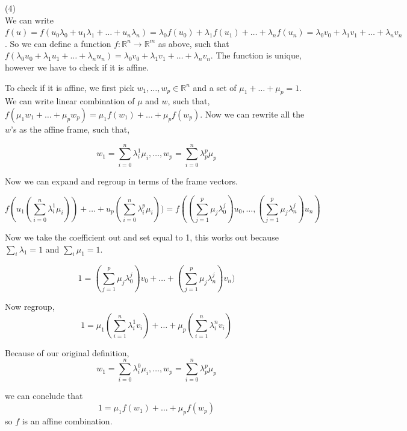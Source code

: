\documentclass[12pt]{article}
\begin{document}
\medskip
(4) \\
We can write $f(u) = f(u_0\lambda_0 + u_1\lambda_1 + \ldots + u_n\lambda_n) = \lambda_0f(u_0) + \lambda_1f(u_1) + \ldots + \lambda_nf(u_n) = \lambda_0v_0 + \lambda_1v_1 + \ldots + \lambda_nv_n$. So we can define a function $f: \mathbb{R} ^n \rightarrow \mathbb{R} ^m$ as above, such that $f(\lambda_0u_0 + \lambda_1u_1 + \ldots + \lambda_nu_n) = \lambda_0v_0 + \lambda_1v_1 + \ldots + \lambda_nv_n$. The function is unique, however we have to check if it is affine. 

To check if it is affine, we first pick $w_1, \ldots, w_p \in \mathbb{R}^n$ and a set of $\mu_1 + \ldots + \mu_p = 1$. We can write linear combination of $\mu$ and $w$, such that, 
$f(\mu_1 w_1 + \ldots + \mu_p w_p) = \mu_1 f(w_1) + \ldots + \mu_p f(w_p)$. Now we can rewrite all the $w$'s as the affine frame, such that, 

$$w_1 = \sum_{i=0}^{n} \lambda_i^1 \mu_i, \ldots, w_p = \sum_{i=0}^{n} \lambda_p^p \mu_p$$

Now we can expand and regroup in terms of the frame vectors. 

$$ f(u_1(\sum_{i=0}^{n} \lambda_{i}^{1} \mu_i)) + \ldots + u_p(\sum_{i=0}^{n} \lambda_{i}^{p} \mu_i)) = f((\sum_{j=1}^{p} \mu_j \lambda_{0}^{j}) u_0, \ldots, (\sum_{j=1}^{p} \mu_j \lambda_{n}^{j}) u_n) $$ 

Now we take the coefficient out and set equal to 1, this works out because $\sum_{i} \lambda_1 = 1$ and  $\sum_{i} \mu_1 = 1$. 

$$1 = (\sum_{j=1}^{p} \mu_j \lambda_{0}^{j}) v_0 + \ldots + (\sum_{j=1}^{p} \mu_j \lambda_{n}^{j}) v_n) $$

Now regroup, 
$$1 = \mu_1(\sum_{i=1}^{n} \lambda_{i}^{1} v_i) + \ldots + \mu_p(\sum_{i=1}^{n} \lambda_{i}^{n} v_i) $$ 

Because of our original definition, $$w_1 = \sum_{i=0}^{n} \lambda_i^0 \mu_i, \ldots, w_p = \sum_{i=0}^{n} \lambda_p^p \mu_p$$

we can conclude that
$$1 = \mu_1 f(w_1) + \ldots + \mu_p f(w_p)$$
so $f$ is an affine combination.  
 
\end{document}
